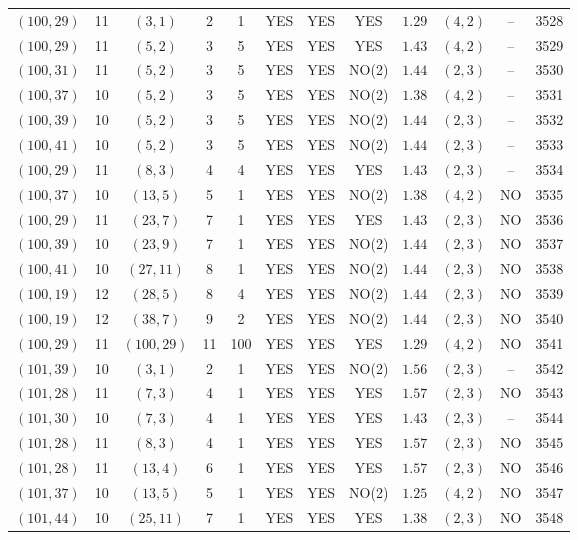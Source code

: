 \begin{longtable}{|c|c|c|c|c|c|c|c|c|c|c|c|}
$(100,29)$ & 11 & $(3,1)$ & 2 & 1 & YES & YES & YES & $1.29$ & $(4,2)$ & -- & 3528\\
$(100,29)$ & 11 & $(5,2)$ & 3 & 5 & YES & YES & YES & $1.43$ & $(4,2)$ & -- & 3529\\
$(100,31)$ & 11 & $(5,2)$ & 3 & 5 & YES & YES & NO(2) & $1.44$ & $(2,3)$ & -- & 3530\\
$(100,37)$ & 10 & $(5,2)$ & 3 & 5 & YES & YES & NO(2) & $1.38$ & $(4,2)$ & -- & 3531\\
$(100,39)$ & 10 & $(5,2)$ & 3 & 5 & YES & YES & NO(2) & $1.44$ & $(2,3)$ & -- & 3532\\
$(100,41)$ & 10 & $(5,2)$ & 3 & 5 & YES & YES & NO(2) & $1.44$ & $(2,3)$ & -- & 3533\\
$(100,29)$ & 11 & $(8,3)$ & 4 & 4 & YES & YES & YES & $1.43$ & $(2,3)$ & -- & 3534\\
$(100,37)$ & 10 & $(13,5)$ & 5 & 1 & YES & YES & NO(2) & $1.38$ & $(4,2)$ & NO & 3535\\
$(100,29)$ & 11 & $(23,7)$ & 7 & 1 & YES & YES & YES & $1.43$ & $(2,3)$ & NO & 3536\\
$(100,39)$ & 10 & $(23,9)$ & 7 & 1 & YES & YES & NO(2) & $1.44$ & $(2,3)$ & NO & 3537\\
$(100,41)$ & 10 & $(27,11)$ & 8 & 1 & YES & YES & NO(2) & $1.44$ & $(2,3)$ & NO & 3538\\
$(100,19)$ & 12 & $(28,5)$ & 8 & 4 & YES & YES & NO(2) & $1.44$ & $(2,3)$ & NO & 3539\\
$(100,19)$ & 12 & $(38,7)$ & 9 & 2 & YES & YES & NO(2) & $1.44$ & $(2,3)$ & NO & 3540\\
$(100,29)$ & 11 & $(100,29)$ & 11 & 100 & YES & YES & YES & $1.29$ & $(4,2)$ & NO & 3541\\
$(101,39)$ & 10 & $(3,1)$ & 2 & 1 & YES & YES & NO(2) & $1.56$ & $(2,3)$ & -- & 3542\\
$(101,28)$ & 11 & $(7,3)$ & 4 & 1 & YES & YES & YES & $1.57$ & $(2,3)$ & NO & 3543\\
$(101,30)$ & 10 & $(7,3)$ & 4 & 1 & YES & YES & YES & $1.43$ & $(2,3)$ & -- & 3544\\
$(101,28)$ & 11 & $(8,3)$ & 4 & 1 & YES & YES & YES & $1.57$ & $(2,3)$ & NO & 3545\\
$(101,28)$ & 11 & $(13,4)$ & 6 & 1 & YES & YES & YES & $1.57$ & $(2,3)$ & NO & 3546\\
$(101,37)$ & 10 & $(13,5)$ & 5 & 1 & YES & YES & NO(2) & $1.25$ & $(4,2)$ & NO & 3547\\
$(101,44)$ & 10 & $(25,11)$ & 7 & 1 & YES & YES & YES & $1.38$ & $(2,3)$ & NO & 3548\\

\end{longtable}
